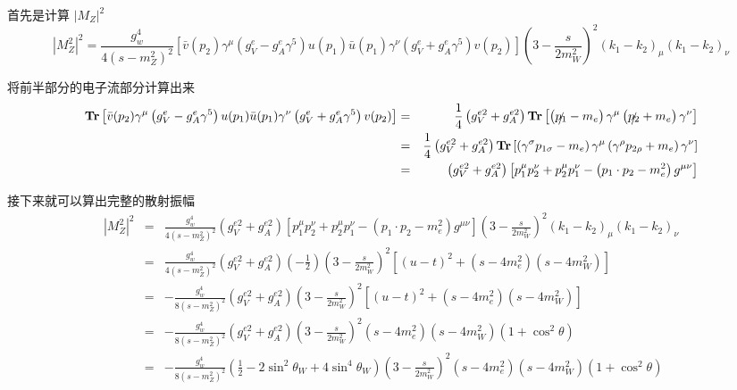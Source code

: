 \documentclass{article}
\newcommand{\Tr}{\mathbf{Tr}}
\begin{document}
首先是计算 $\left|M_{Z}\right|^2$
\begin{equation*}
    \left|M_Z^2\right|^2 = \frac{g_w^4}{4(s - m_Z^2)^2}\left[\bar{v}(p_2)\gamma^\mu \left(g_V^e - g_A^e \gamma^5\right) u(p_1)\bar{u}(p_1)\gamma^\nu \left(g_V^e + g_A^e \gamma^5\right) v(p_2)\right] \left(3 - \frac{s}{2m_W^2}\right)^2 (k_1 - k_2)_\mu (k_1 - k_2)_\nu
\end{equation*}

将前半部分的电子流部分计算出来
\begin{eqnarray*}
    \Tr\left[\bar{v}(p_2)\gamma^\mu \left(g_V^e - g_A^e \gamma^5\right) u(p_1)\bar{u}(p_1)\gamma^\nu \left(g_V^e + g_A^e \gamma^5\right) v(p_2)\right] &=& \frac{1}{4} \left(g_V^{e2} + g_A^{e2}\right) \mathbf{Tr} \left[\left(\slashed{p_1} - m_e\right)\gamma^\mu \left(\slashed{p_2} + m_e\right)\gamma^\nu\right] \\
    &=& \frac{1}{4}\left(g_V^{e2} + g_A^{e2}\right)\Tr\left[\left(\gamma^\sigma p_{1\sigma} - m_e\right)\gamma^\mu \left(\gamma^\rho p_{2\rho} + m_e\right)\gamma^\nu\right] \\
    &=& \left(g_V^{e2} + g_A^{e2}\right)\left[p_1^\mu p_2^\nu + p_2^\mu p_1^\nu - \left(p_1 \cdot p_2 - m_e^2\right)g^{\mu\nu}\right]
\end{eqnarray*}

接下来就可以算出完整的散射振幅
\begin{eqnarray*}
    \left|M_Z^2\right|^2 &=& \frac{g_w^4}{4(s - m_Z^2)^2}\left(g_V^{e2} + g_A^{e2}\right)\left[p_1^\mu p_2^\nu + p_2^\mu p_1^\nu - \left(p_1 \cdot p_2 - m_e^2\right)g^{\mu\nu}\right] \left(3 - \frac{s}{2m_W^2}\right)^2 (k_1 - k_2)_\mu (k_1 - k_2)_\nu \\
    &=& \frac{g_w^4}{4(s - m_Z^2)^2}\left(g_V^{e2} + g_A^{e2}\right) (-\frac{1}{2})\left(3 - \frac{s}{2m_W^2}\right)^2\left[(u - t)^2 + \left(s - 4m_e^2 \right)\left(s - 4m_W^2\right)\right] \\
    &=& -\frac{g_w^4}{8(s - m_Z^2)^2}\left(g_V^{e2} + g_A^{e2}\right)\left(3 - \frac{s}{2m_W^2}\right)^2\left[(u - t)^2 + \left(s - 4m_e^2 \right)\left(s - 4m_W^2\right)\right] \\
    &=& -\frac{g_w^4}{8(s - m_Z^2)^2}\left(g_V^{e2} + g_A^{e2}\right)\left(3 - \frac{s}{2m_W^2}\right)^2 \left(s - 4m_e^2 \right)\left(s - 4m_W^2\right) \left(1 + \cos^2{\theta}\right) \\
    &=& -\frac{g_w^4}{8(s - m_Z^2)^2}\left(\frac{1}{2} - 2\sin^2{\theta_W} + 4\sin^4{\theta_W}\right)\left(3 - \frac{s}{2m_W^2}\right)^2 \left(s - 4m_e^2 \right)\left(s - 4m_W^2\right) \left(1 + \cos^2{\theta}\right)
\end{eqnarray*}
\end{document}
